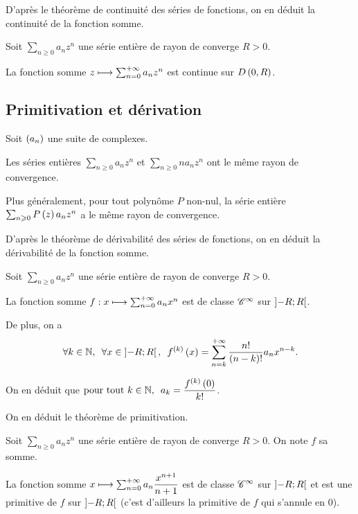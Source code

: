D'après le théorème de continuité des séries de fonctions, on en déduit la continuité de la fonction somme.

\begin{theo}
Soit \(\sum_{n\geq0}a_nz^n\) une série entière de rayon de converge \(R>0\).

La fonction somme \(z\longmapsto\sum_{n=0}^{+\infty}a_nz^n\) est continue sur \(D\left(0,R\right)\).
\end{theo}

\subsection{Primitivation et dérivation}

\begin{lem}
Soit \(\left(a_n\right)\) une suite de complexes.

Les séries entières \(\sum_{n\geq0}a_nz^n\) et \(\sum_{n\geq0}na_nz^n\) ont le même rayon de convergence.

Plus généralement, pour tout polynôme \(P\) non-nul, la série entière \(\sum_{n\geqslant0}P\left(z\right)a_nz^n\) a le même rayon de convergence.
\end{lem}

D'après le théorème de dérivabilité des séries de fonctions, on en déduit la dérivabilité de la fonction somme.

\begin{theo}
Soit \(\sum_{n\geq0}a_nz^n\) une série entière de rayon de converge \(R>0\).

La fonction somme \(f:x\longmapsto\sum_{n=0}^{+\infty}a_nx^n\) est de classe \(\mathscr{C}^{\infty}\) sur \(\left]-R;R\right[\).

De plus, on a \[\quantifs{\forall k\in\N;\forall x\in\intervee{-R}{R}}f\deriv{k}\paren{x}=\sum_{n=k}^{\pinf}\dfrac{n!}{\paren{n-k}!}a_nx^{n-k}.\]

On en déduit que \(\quantifs{\tpt k\in\N}a_k=\dfrac{f\deriv{k}\paren{0}}{k!}\).
\end{theo}

On en déduit le théorème de primitivation.

\begin{theo}
Soit \(\sum_{n\geq0}a_nz^n\) une série entière de rayon de converge \(R>0\). On note \(f\) sa somme.

La fonction somme \(x\longmapsto\sum_{n=0}^{+\infty}a_n\dfrac{x^{n+1}}{n+1}\) est de classe \(\mathscr{C}^{\infty}\) sur \(\left]-R;R\right[\) et est une primitive de \(f\) sur \(\left]-R;R\right[\) (c'est d'ailleurs la primitive de \(f\) qui s'annule en \(0\)).
\end{theo}

